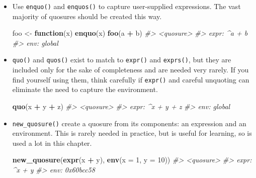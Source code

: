 \documentclass[]{book}
\makeatletter
\newenvironment{Shaded}{\begin{snugshade}}{\end{snugshade}}
\newcommand{\CommentTok}[1]{\textcolor[rgb]{0.37,0.37,0.37}{\textit{#1}}}
\newcommand{\ControlFlowTok}[1]{\textcolor[rgb]{0.27,0.27,0.27}{\textbf{#1}}}
\newcommand{\DataTypeTok}[1]{\textcolor[rgb]{0.27,0.27,0.27}{#1}}
\newcommand{\DecValTok}[1]{\textcolor[rgb]{0.06,0.06,0.06}{#1}}
\newcommand{\KeywordTok}[1]{\textcolor[rgb]{0.27,0.27,0.27}{\textbf{#1}}}
\newcommand{\NormalTok}[1]{#1}
\newcommand{\OperatorTok}[1]{\textcolor[rgb]{0.43,0.43,0.43}{\textbf{#1}}}
\newcommand{\StringTok}[1]{\textcolor[rgb]{0.5,0.5,0.5}{#1}}
\newcommand{\indexc}[1]{\index{#1@\texttt{#1}}}
\makeatother
\begin{document}
\begin{itemize}
\item
  Use \texttt{enquo()} and \texttt{enquos()} to capture user-supplied expressions.
  The vast majority of quosures should be created this way.

\begin{Shaded}
\begin{Highlighting}[]
\NormalTok{foo <-}\StringTok{ }\ControlFlowTok{function}\NormalTok{(x) }\KeywordTok{enquo}\NormalTok{(x)}
\KeywordTok{foo}\NormalTok{(a }\OperatorTok{+}\StringTok{ }\NormalTok{b)}
\CommentTok{#> <quosure>}
\CommentTok{#> expr: ^a + b}
\CommentTok{#> env:  global}
\end{Highlighting}
\end{Shaded}

  \indexc{enquo()}
\item
  \texttt{quo()} and \texttt{quos()} exist to match to \texttt{expr()} and \texttt{exprs()}, but
  they are included only for the sake of completeness and are needed very
  rarely. If you find yourself using them, think carefully if \texttt{expr()} and
  careful unquoting can eliminate the need to capture the environment.

\begin{Shaded}
\begin{Highlighting}[]
\KeywordTok{quo}\NormalTok{(x }\OperatorTok{+}\StringTok{ }\NormalTok{y }\OperatorTok{+}\StringTok{ }\NormalTok{z)}
\CommentTok{#> <quosure>}
\CommentTok{#> expr: ^x + y + z}
\CommentTok{#> env:  global}
\end{Highlighting}
\end{Shaded}

\item
  \texttt{new\_quosure()} create a quosure from its components: an expression and
  an environment. This is rarely needed in practice, but is useful for
  learning, so is used a lot in this chapter.

\begin{Shaded}
\begin{Highlighting}[]
\KeywordTok{new_quosure}\NormalTok{(}\KeywordTok{expr}\NormalTok{(x }\OperatorTok{+}\StringTok{ }\NormalTok{y), }\KeywordTok{env}\NormalTok{(}\DataTypeTok{x =} \DecValTok{1}\NormalTok{, }\DataTypeTok{y =} \DecValTok{10}\NormalTok{))}
\CommentTok{#> <quosure>}
\CommentTok{#> expr: ^x + y}
\CommentTok{#> env:  0x60bcc58}
\end{Highlighting}
\end{Shaded}
\end{itemize}
\end{document}
